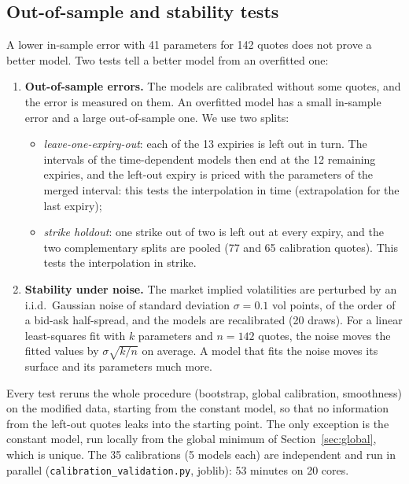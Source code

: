 \documentclass[11pt,a4paper]{article}
\theoremstyle{plain}
\theoremstyle{definition}
\begin{document}
\subsection{Out-of-sample and stability tests}
\label{sec:td_validation}
A lower in-sample error with 41 parameters for 142 quotes does not prove a better model. Two tests tell a better model from an overfitted one:
\begin{enumerate}
    \item \textbf{Out-of-sample errors.} The models are calibrated without some quotes, and the error is measured on them. An overfitted model has a small in-sample error and a large out-of-sample one. We use two splits:
    \begin{itemize}
        \item \emph{leave-one-expiry-out}: each of the 13 expiries is left out in turn. The intervals of the time-dependent models then end at the 12 remaining expiries, and the left-out expiry is priced with the parameters of the merged interval: this tests the interpolation in time (extrapolation for the last expiry);
        \item \emph{strike holdout}: one strike out of two is left out at every expiry, and the two complementary splits are pooled (77 and 65 calibration quotes). This tests the interpolation in strike.
    \end{itemize}
    \item \textbf{Stability under noise.} The market implied volatilities are perturbed by an i.i.d.\ Gaussian noise of standard deviation $\sigma=0.1$ vol points, of the order of a bid-ask half-spread, and the models are recalibrated (20 draws). For a linear least-squares fit with $k$ parameters and $n=142$ quotes, the noise moves the fitted values by $\sigma\sqrt{k/n}$ on average. A model that fits the noise moves its surface and its parameters much more.
\end{enumerate}
Every test reruns the whole procedure (bootstrap, global calibration, smoothness) on the modified data, starting from the constant model, so that no information from the left-out quotes leaks into the starting point. The only exception is the constant model, run locally from the global minimum of Section~\ref{sec:global}, which is unique. The 35 calibrations (5 models each) are independent and run in parallel (\texttt{calibration\_validation.py}, joblib): 53 minutes on 20 cores.
\end{document}
